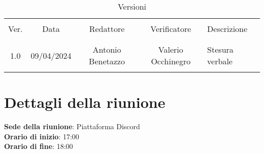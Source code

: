 \documentclass[italian,12pt]{article}
\begin{document}


\newpage



\begin{table}[!h]
	\caption{Versioni}
	\footnotesize
	\begin{center}
		\begin{tabular}{ c c c c p{6.1cm} }
			\hline                                                                                                      \\[-2ex]
			Ver. & Data       & Redattore          & Verificatore       & Descrizione                                   \\
			\\[-2ex] \hline \\[-1.5ex]
			1.0  & 09/04/2024 & Antonio Benetazzo  & Valerio Occhinegro & Stesura verbale                               \\
			\\[-1.5ex] \hline
		\end{tabular}
	\end{center}
\end{table}

\newpage

\tableofcontents

\newpage

\section{Dettagli della riunione}


\textbf{Sede della riunione}: Piattaforma Discord\\
\textbf{Orario di inizio}: 17:00\\
\textbf{Orario di fine}: 18:00\\
\end{document}
